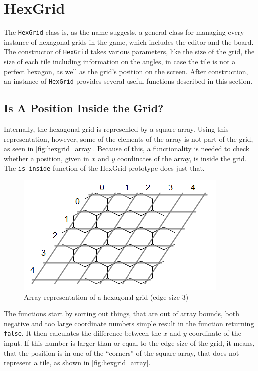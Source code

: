 \section{HexGrid}
\label{sec:hexgrid}

The \texttt{HexGrid} class is, as the name suggests, a general class for managing every instance of hexagonal grids in the game, which includes the editor and the board.
The constructor of \texttt{HexGrid} takes various parameters, like the size of the grid, the size of each tile including information on the angles, in case the tile is not a perfect hexagon, as well as the grid's position on the screen.
After construction, an instance of \texttt{HexGrid} provides several useful functions described in this section.

\subsection{Is A Position Inside the Grid?}
Internally, the hexagonal grid is represented by a square array.
Using this representation, however, some of the elements of the array is not part of the grid, as seen in \autoref{fig:hexgrid_array}.
Because of this, a functionality is needed to check whether a position, given in $x$ and $y$ coordinates of the array, is inside the grid.
The \texttt{is\_inside} function of the HexGrid prototype does just that.

\begin{figure}[ht]
	\includegraphics[scale=1]{img/hexgrid_array.png}
	\caption{Array representation of a hexagonal grid (edge size 3)}
	\label{fig:hexgrid_array}
\end{figure}

The functions start by sorting out things, that are out of array bounds, both negative and too large coordinate numbers simple result in the function returning \verb|false|.
It then calculates the difference between the $x$ and $y$ coordinate of the input.
If this number is larger than or equal to the edge size of the grid, it means, that the position is in one of the ``corners'' of the square array, that does not represent a tile, as shown in \autoref{fig:hexgrid_array}.

